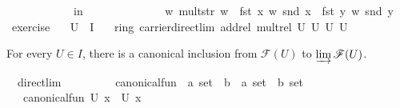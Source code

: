 \documentclass[12pt]{scrartcl}
\begin{document}
\begin{isabelle}
\ \ \ \ \ \ \ \ \ \ \ \ in\isanewline
\ \ \ \ \ \ \ \ \ \ \ \ \ \ {\isasymlfloor}w{\isacharcomma}{\kern0pt}\ mult{\isacharunderscore}{\kern0pt}str\ w\ {\isacharparenleft}{\kern0pt}{\isasymrho}\ {\isacharparenleft}{\kern0pt}fst\ x{\isacharparenright}{\kern0pt}\ w\ {\isacharparenleft}{\kern0pt}snd\ x{\isacharparenright}{\kern0pt}{\isacharparenright}{\kern0pt}\ {\isacharparenleft}{\kern0pt}{\isasymrho}\ {\isacharparenleft}{\kern0pt}fst\ y{\isacharparenright}{\kern0pt}\ w\ {\isacharparenleft}{\kern0pt}snd\ y{\isacharparenright}{\kern0pt}{\isacharparenright}{\kern0pt}{\isasymrfloor}{\isachardoublequoteclose}\isanewline
\isanewline
{}\isamarkupfalse%
\ exercise{\isacharunderscore}{\kern0pt}{}{\isacharunderscore}{\kern0pt}{}{}{\isacharcolon}{\kern0pt}\isanewline
\ \ \ {\isachardoublequoteopen}U\ {\isasymin}\ I{\isachardoublequoteclose}\isanewline
\ \ \ {\isachardoublequoteopen}ring\ carrier{\isacharunderscore}{\kern0pt}direct{\isacharunderscore}{\kern0pt}lim\ add{\isacharunderscore}{\kern0pt}rel\ mult{\isacharunderscore}{\kern0pt}rel\ {\isasymlfloor}U{\isacharcomma}{\kern0pt}\ {\isasymzero}\isactrlbsub U\isactrlesub {\isasymrfloor}\ {\isasymlfloor}U{\isacharcomma}{\kern0pt}\ {\isasymone}\isactrlbsub U\isactrlesub {\isasymrfloor}{\isachardoublequoteclose}\isanewline
\isanewline
{}
\end{isabelle}

For every $U \in I$, there is a canonical inclusion from $\mathscr{F}(U)$ to $\varinjlim \mathscr{F}(U)$. 

\begin{isabelle}
\isamarkupfalse%
\ {\isacharparenleft}{\kern0pt}\ direct{\isacharunderscore}{\kern0pt}lim{\isacharparenright}{\kern0pt}\ \isanewline
\ \ \ \ \ \ \ \ canonical{\isacharunderscore}{\kern0pt}fun\ {\isacharcolon}{\kern0pt}{\isacharcolon}{\kern0pt}\ {\isachardoublequoteopen}{\isacharprime}{\kern0pt}a\ set\ {\isasymRightarrow}\ {\isacharprime}{\kern0pt}b\ {\isasymRightarrow}\ {\isacharparenleft}{\kern0pt}{\isacharprime}{\kern0pt}a\ set\ {\isasymtimes}\ {\isacharprime}{\kern0pt}b{\isacharparenright}{\kern0pt}\ set{\isachardoublequoteclose}\isanewline
\ \ \ {\isachardoublequoteopen}canonical{\isacharunderscore}{\kern0pt}fun\ U\ x\ {\isacharequal}{\kern0pt}\ {\isasymlfloor}U{\isacharcomma}{\kern0pt}\ x{\isasymrfloor}{\isachardoublequoteclose}
\end{isabelle}
\end{document}
